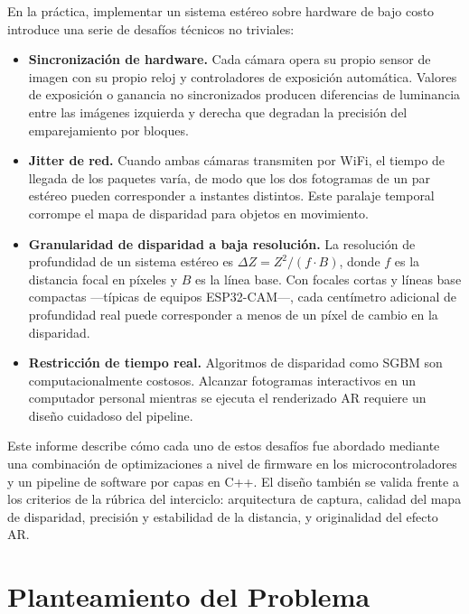 \documentclass[12pt, a4paper]{article}
\begin{document}
En la práctica, implementar un sistema estéreo sobre hardware de bajo costo introduce
una serie de desafíos técnicos no triviales:

\begin{itemize}[leftmargin=2em]
  \item \textbf{Sincronización de hardware.} Cada cámara opera su propio sensor de
        imagen con su propio reloj y controladores de exposición automática. Valores
        de exposición o ganancia no sincronizados producen diferencias de luminancia
        entre las imágenes izquierda y derecha que degradan la precisión del
        emparejamiento por bloques.
  \item \textbf{Jitter de red.} Cuando ambas cámaras transmiten por WiFi, el tiempo
        de llegada de los paquetes varía, de modo que los dos fotogramas de un par
        estéreo pueden corresponder a instantes distintos. Este paralaje temporal
        corrompe el mapa de disparidad para objetos en movimiento.
  \item \textbf{Granularidad de disparidad a baja resolución.} La resolución de
        profundidad de un sistema estéreo es $\Delta Z = Z^2 / (f \cdot B)$, donde
        $f$ es la distancia focal en píxeles y $B$ es la línea base. Con focales cortas
        y líneas base compactas —típicas de equipos ESP32-CAM—, cada centímetro
        adicional de profundidad real puede corresponder a menos de un píxel de cambio
        en la disparidad.
  \item \textbf{Restricción de tiempo real.} Algoritmos de disparidad como SGBM son
        computacionalmente costosos. Alcanzar fotogramas interactivos en un computador
        personal mientras se ejecuta el renderizado AR requiere un diseño cuidadoso
        del pipeline.
\end{itemize}

Este informe describe cómo cada uno de estos desafíos fue abordado mediante una
combinación de optimizaciones a nivel de firmware en los microcontroladores y un
pipeline de software por capas en C++. El diseño también se valida frente a los
criterios de la rúbrica del interciclo: arquitectura de captura, calidad del mapa de
disparidad, precisión y estabilidad de la distancia, y originalidad del efecto AR.

\section{Planteamiento del Problema}
\end{document}

